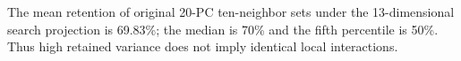 The mean retention of original 20-PC ten-neighbor sets under the 13-dimensional search projection is 69.83\%; the median is 70\% and the fifth percentile is 50\%. Thus high retained variance does not imply identical local interactions.
